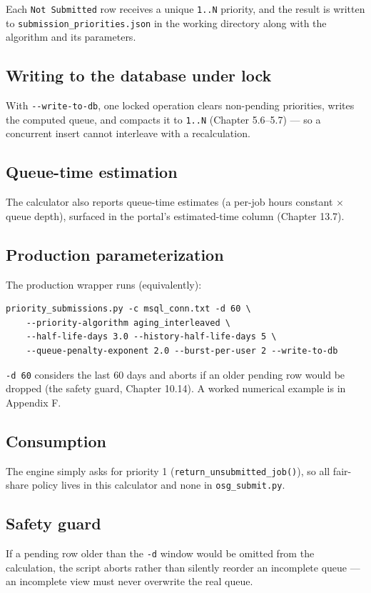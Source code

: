 Each \texttt{Not Submitted} row receives a unique \texttt{1.\allowbreak{}.\allowbreak{}N} priority, and the
result is written to \texttt{submission\_\allowbreak{}priorities.\allowbreak{}json} in the working directory
along with the algorithm and its parameters.

\subsection{Writing to the database under lock}

With \texttt{-\allowbreak{}-\allowbreak{}write-\allowbreak{}to-\allowbreak{}db}, one locked operation clears
non-pending priorities, writes the computed queue, and compacts it to \texttt{1.\allowbreak{}.\allowbreak{}N}
(Chapter 5.6--5.7) --- so a concurrent insert cannot interleave with a recalculation.

\subsection{Queue-time estimation}

The calculator also reports queue-time estimates (a per-job hours constant $\times$ queue depth), surfaced in
the portal's estimated-time column (Chapter 13.7).

\subsection{Production parameterization}

The production wrapper runs (equivalently):

\begin{lstlisting}
priority_submissions.py -c msql_conn.txt -d 60 \
    --priority-algorithm aging_interleaved \
    --half-life-days 3.0 --history-half-life-days 5 \
    --queue-penalty-exponent 2.0 --burst-per-user 2 --write-to-db
\end{lstlisting}

\texttt{-\allowbreak{}d 60} considers the last 60 days and aborts if an older pending row would be dropped (the
safety guard, Chapter 10.14). A worked numerical example is in Appendix F.

\subsection{Consumption}

The engine simply asks for priority 1 (\texttt{return\_\allowbreak{}unsubmitted\_\allowbreak{}job()}), so all
fair-share policy lives in this calculator and none in \texttt{osg\_\allowbreak{}submit.\allowbreak{}py}.

\subsection{Safety guard}

If a pending row older than the \texttt{-\allowbreak{}d} window would be omitted from the calculation, the
script aborts rather than silently reorder an incomplete queue --- an incomplete view must never overwrite the
real queue.
